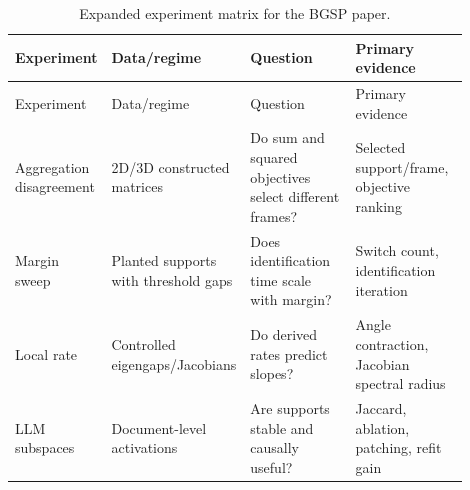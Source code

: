 \begingroup\setlength{\tabcolsep}{3pt}\begin{longtable}{@{}p{0.16\linewidth}p{0.20\linewidth}p{0.27\linewidth}p{0.27\linewidth}@{}}
\caption{Expanded experiment matrix for the BGSP paper.}\label{tab:a-experiment-matrix-expanded}\\
\toprule
Experiment & Data/regime & Question & Primary evidence \\
\midrule
\endfirsthead
\toprule
Experiment & Data/regime & Question & Primary evidence \\
\midrule
\endhead
Aggregation disagreement & 2D/3D constructed matrices & Do sum and squared objectives select different frames? & Selected support/frame, objective ranking \\
Margin sweep & Planted supports with threshold gaps & Does identification time scale with margin? & Switch count, identification iteration \\
Local rate & Controlled eigengaps/Jacobians & Do derived rates predict slopes? & Angle contraction, Jacobian spectral radius \\
LLM subspaces & Document-level activations & Are supports stable and causally useful? & Jaccard, ablation, patching, refit gain \\
\bottomrule
\end{longtable}\endgroup
